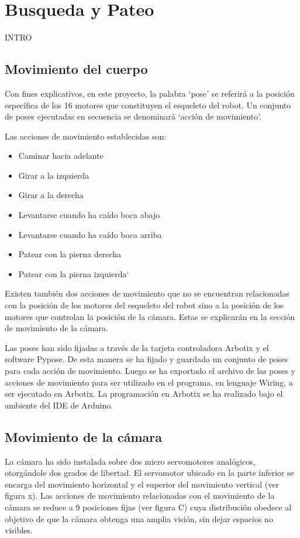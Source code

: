 \label{chapter:busqueda}
\section{Busqueda y Pateo}

INTRO 
\subsection{Movimiento del cuerpo}

Con fines explicativos, en este proyecto, la palabra ‘pose’ se referirá a la posición específica de los 16 motores que constituyen el esqueleto del robot. Un conjunto de poses ejecutadas en secuencia se denominará ‘acción de movimiento’.


Las acciones de movimiento establecidas son:


\begin{itemize}
 \item {Caminar hacia adelante}
 \item {Girar a la izquierda}
 \item {Girar a la derecha}
 \item {Levantarse cuando ha caído boca abajo}
 \item {Levantarse cuando ha caído boca arriba}
 \item {Patear con la pierna derecha }
 \item {Patear con la pierna izquierda`}
 
\end{itemize}

Existen también dos acciones de movimiento que no se encuentran relacionadas con la posición de los motores del esqueleto del robot sino a la posición de los motores que controlan la posición de la cámara. Estas se explicarán en la sección de movimiento de la cámara.

Las poses han sido fijadas a través de la tarjeta controladora Arbotix y el software Pypose. De esta manera se ha fijado y guardado un conjunto de poses para cada acción de movimiento. Luego se ha exportado el archivo de las poses y acciones de movimiento para ser utilizado en el programa, en lenguaje Wiring, a ser ejecutado en Arbotix. La programación en Arbotix se ha realizado bajo el ambiente del IDE de Arduino. 


\subsection{Movimiento de la cámara}
La cámara ha sido instalada sobre dos micro servomotores analógicos, otorgándole dos grados de libertad. El servomotor ubicado en la parte inferior se encarga del movimiento horizontal y el superior del movimiento vertical (ver figura x). Las acciones de movimiento relacionadas con el movimiento de la cámara se reduce a 9 posiciones fijas (ver figura C) cuya distribución obedece al objetivo de que la cámara obtenga una amplia visión, sin dejar espacios no visibles. 



